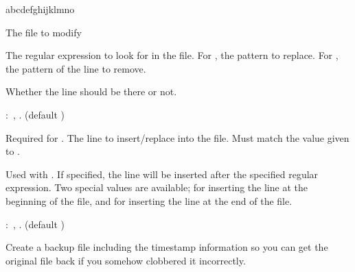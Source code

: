 \begin{xlist}{abcdefghijklmno}
  \item[\man\,\C{name}]
	The file to modify 
		
		\item[\man\,\C{regexp}]
	The regular expression to look for in the file. For , the pattern to replace. For , the pattern of the line to remove. 
		
		\item[\opt\,\C{state}]
	Whether the line should be there or not. 
		
		:\,
		    ,
		    .
		    (default )
		\item[\opt\,\C{line}]
	Required for . The line to insert/replace into the file. Must match the value given to . 
		
		\item[\opt\,\C{insertafter}]
	Used with . If specified, the line will be inserted after the specified regular expression. Two special values are available;  for inserting the line at the beginning of the file, and  for inserting the line at the end of the file. 
		
		:\,
		    ,
		    .
		    (default )
		\item[\opt\,\C{backup}]
	Create a backup file including the timestamp information so you can get the original file back if you somehow clobbered it incorrectly. 
		
		\end{xlist}



